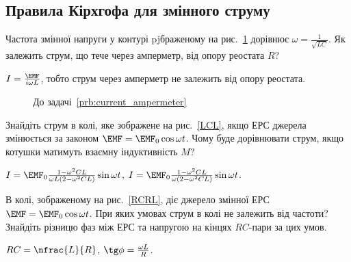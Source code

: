 \subsection*{Правила Кірхгофа для змінного струму}

\begin{problem}\label{prb:current_ampermeter}
Частота змінної напруги у контурі pjбраженому на рис.~\ref{current_ampermeter} дорівнює $\omega = \frac{1}{\sqrt{LC}}$. Як залежить струм, що тече через амперметр, від опору реостата $R$?
\begin{solution}
	$I = \frac{\EMF}{i\omega L}$, тобто струм через амперметр не залежить від опору реостата.
\end{solution}
\end{problem}
\begin{figure}[h!]\centering
\caption{До задачі~\ref{prb:current_ampermeter}}
\label{current_ampermeter}
\end{figure}

\begin{problem}\label{prb:LCL}%
Знайдіть струм в колі, яке зображене на рис.~\ref{LCL}, якщо ЕРС джерела змінюється за законом $\EMF = \EMF_0\cos\omega t$. Чому буде дорівнювати струм, якщо котушки матимуть взаємну індуктивність $M$?
\begin{solution}
	$I = \EMF_0\frac{1 - \omega^2CL}{\omega L(2 - \omega^2CL)}\sin\omega t$, $I = \EMF_0\frac{1 - \omega^2CL}{\omega(2 - \omega^2CL)}\sin\omega t$.
\end{solution}
\end{problem}

\begin{problem}\label{prb:RCRL}%
В колі, зображеному на рис.~\ref{RCRL}, діє джерело змінної ЕРС  $\EMF = \EMF_0\cos\omega t$. При яких умовах струм в колі не залежить від частоти? Знайдіть різницю фаз між ЕРС та напругою на кінцях $RC$-пари за цих умов.
\begin{solution}
	$RC = \nfrac{L}{R}$, $\tg\phi = \frac{\omega L}{R}$.
\end{solution}
\end{problem}

